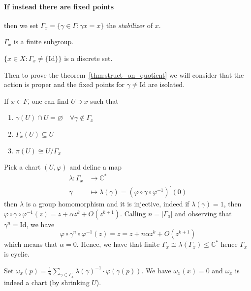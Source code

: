 \paragraph{If instead there are fixed points} then we set \(\Gamma_x =
\{\gamma \in \Gamma : \gamma x = x\} \) the \emph{stabilizer} of \(x\).

\begin{proposition}{}
    \(\Gamma_x\) is a finite subgroup.
\end{proposition}
\begin{proposition}{}
    \(\{x \in X : \Gamma_x \neq \{\mathrm{Id}\} \} \) is a discrete set. 
\end{proposition}

Then to prove the theorem~\ref{thm:struct_on_quotient} we will consider that the
action is proper and the fixed points for \(\gamma \neq \mathrm{Id}\) are isolated.

\begin{proposition}{}
    If \(x \in F\), one can find \(U \ni x\) such that
\begin{enumerate}[label = \arabic*.]
    \item \(\gamma {(U)} \cap U = \varnothing \quad \forall \gamma \not\in
        \Gamma_x\) 
    \item \(\Gamma_x {(U)} \subseteq U \) 
    \item \(\pi {(U)} \cong U / \Gamma_x\) 
\end{enumerate}
\end{proposition}

Pick a chart \({(U, \varphi )}\) and define a map \begin{align*}
    \lambda: \Gamma_x &\longrightarrow \mathbb{C}^{*} \\
    \gamma &\longmapsto \lambda(\gamma) = {\left( \varphi \circ \gamma \circ
    \varphi ^{-1} \right)}^{\prime} {(0)}
\end{align*}
then \(\lambda\) is a group homomorphism and it is injective, indeed if
\(\lambda {(\gamma)} = 1\), then \(\varphi  \circ \gamma \circ \varphi
^{-1}{(z)} = z + \alpha z^{k} + O{(z^{k+1})}\). Calling \(n = |\Gamma_a|\) and
observing that \(\gamma^{n} = \mathrm{Id}\), we have
\[
  \varphi \circ \gamma^{n} \circ \varphi ^{-1}{(z)} = z = z + n \alpha z^{k} + O
  {(z^{k+1})}
\]
which means that \(\alpha = 0\). Hence, we have that finite \(\Gamma_x \cong \lambda
{(\Gamma_x)} \le \mathbb{C}^{*}\) hence \(\Gamma_x\) is cyclic. 


Set \(\omega_x {(p)} = \frac{1}{n}\sum_{\gamma \in \Gamma_x}
\lambda{(\gamma)}^{-1} \cdot \varphi {(\gamma {(p)})}\). We have \(\omega_x{(x)}
= 0\) and \(\omega_x\) is indeed a chart (by shrinking \(U\)).

